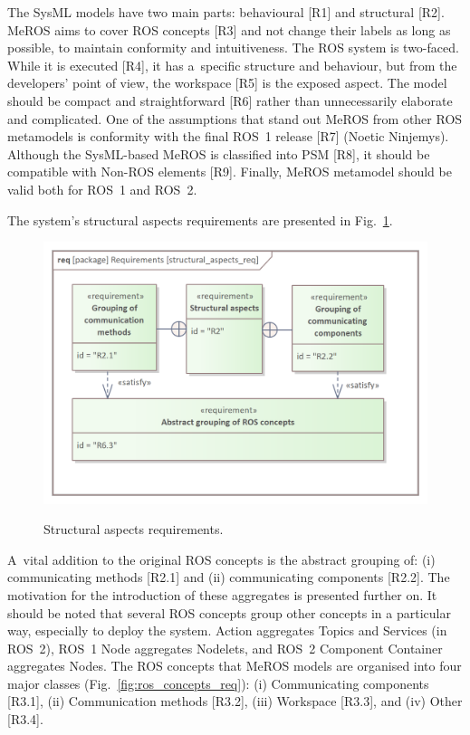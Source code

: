 \documentclass{ieeeaccess}
\begin{document}
	
	The SysML models have two main parts: behavioural [R1] and structural [R2]. MeROS aims to cover ROS concepts [R3] and not change their labels as long as possible, to maintain conformity and intuitiveness. The ROS system is two-faced. While it is executed [R4], it has a~specific structure and behaviour, but from the developers' point of view, the workspace [R5] is the exposed aspect. The model should be compact and straightforward [R6] rather than unnecessarily elaborate and complicated. One of the assumptions that stand out MeROS from other ROS metamodels is conformity with the final ROS~1 release [R7] (Noetic Ninjemys). Although the SysML-based MeROS is classified into PSM [R8], it should be compatible with Non-ROS elements [R9]. Finally, MeROS metamodel should be valid both for ROS~1 and ROS~2.
	
	The system's structural aspects requirements are presented in Fig.~\ref{fig:structural_aspects_req}.
	
	\begin{figure}[htb]
		\centering
		\begin{center}
			{\includegraphics[scale=0.7]{img/requirement_pkg/structural_aspects_req.png}}
		\end{center}
		\caption{Structural aspects requirements.} 
		\label{fig:structural_aspects_req}
	\end{figure}
	
	A~vital addition to the original ROS concepts is the abstract grouping of: (i) communicating methods [R2.1] and (ii) communicating components [R2.2]. The motivation for the introduction of these aggregates is presented further on. It should be noted that several ROS concepts group other concepts in a particular way, especially to deploy the system. Action aggregates Topics and Services (in ROS~2), ROS~1 Node aggregates Nodelets, and ROS~2 Component Container aggregates Nodes.
	The ROS concepts that MeROS models are organised into four major classes (Fig.~\ref{fig:ros_concepts_req}): (i) Communicating components [R3.1], (ii) Communication methods [R3.2], (iii) Workspace [R3.3], and (iv) Other [R3.4].
	
\end{document}
